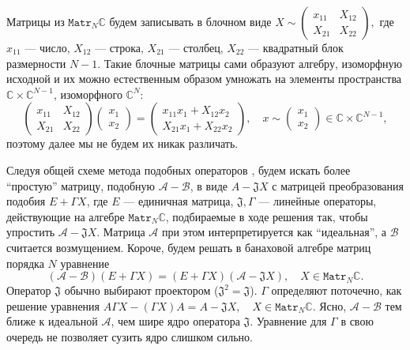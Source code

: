 Матрицы из \( \mathtt{Matr}_N\mathbb{C} \) будем записывать в блочном виде
\( X \sim
    \begin{pmatrix}
    x_{11} & X_{12} \\
    X_{21} & X_{22}
    \end{pmatrix}, \)
    где \( x_{11} \) --- число,
    \( X_{12} \) --- строка, \( X_{21} \) --- столбец,
    \( X_{22} \) --- квадратный блок размерности \( N-1 \).
Такие блочные матрицы сами образуют алгебру, изоморфную исходной
и их можно естественным образом умножать
на элементы пространства \( \mathbb{C}\times\mathbb{C}^{N-1} \),
изоморфного \( \mathbb{C}^N \):
\[
    \begin{pmatrix}
    x_{11} & X_{12} \\
    X_{21} & X_{22}
    \end{pmatrix}
    \begin{pmatrix} x_1 \\ x_2 \end{pmatrix}
  = \begin{pmatrix}
      x_{11} x_1 + X_{12} x_2 \\
      X_{21} x_1 + X_{22} x_2
      \end{pmatrix},\quad x \sim \begin{pmatrix} x_1 \\ x_2 \end{pmatrix}\in \mathbb{C}\times\mathbb{C}^{N-1},
    \]
поэтому далее мы не будем их никак различать.

Следуя общей схеме метода подобных операторов \cite{baskakov-split},
будем искать более ``простую'' матрицу, подобную \( \mathcal{A} - \mathcal{B} \),
в виде \( A - \mathfrak{J} X \)
с матрицей преобразования подобия \( E + \Gamma X \),
где \( E \) --- единичная матрица,
\( \mathfrak{J},\Gamma \) --- линейные операторы,
действующие на алгебре \( \mathtt{Matr}_N\mathbb{C} \),
подбираемые в ходе решения так, чтобы упростить \( \mathcal{A} - \mathfrak{J}X \).
Матрица \( \mathcal{A} \) при этом интерпретируется как ``идеальная'',
а \( \mathcal{B} \) считается возмущением.
Короче, будем решать в банаховой алгебре матриц порядка \( N \) уравнение
\begin{equation}\label{simeqn}
    (\mathcal{A-B})(E+\Gamma X) = (E+\Gamma X)(\mathcal{A} - \mathfrak{J} X), \quad X\in\mathtt{Matr}_N\mathbb{C}.
    \end{equation}
Оператор \( \mathfrak{J} \) обычно выбирают проектором (\(\mathfrak{J}^2=\mathfrak{J}\)).
\( \Gamma \) определяют поточечно, как решение уравнения
\( A\Gamma X - (\Gamma X) A = A - \mathfrak{J} X, \quad X\in\mathtt{Matr}_N\mathbb{C} \).
Ясно, \( \mathcal{A}-\mathcal{B} \) тем ближе к идеальной \( \mathcal{A} \),
чем шире ядро оператора \( \mathfrak{J} \).
Уравнение для \( \Gamma \) в свою очередь не позволяет сузить ядро слишком сильно.

